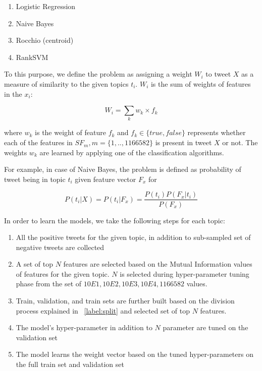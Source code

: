\begin{enumerate}
\item Logistic Regression
\item Naive Bayes
\item Rocchio (centroid)
\item RankSVM
\end{enumerate}

To this purpose, we define the problem as assigning a weight ${W_{i}}$ to tweet ${X}$ as a measure of similarity to the given topics ${t_{i}}$. ${W_{i}}$ is the sum of weights of  features in the ${x_{i}}$:

\begin{equation}
W_{i} = \sum_{k} w_{k}\times f_{k}
\end{equation}

where ${w_{k}}$ is the weight of feature ${f_{k}}$ and ${f_{k} \in \{true, false\}}$ represents whether each of the features in ${SF_{m}},m = \{ 1,..,1166582 \} $ is present in tweet ${X}$ or not. The weights ${w_{k}}$ are learned by applying one of the classification algorithms.

For example, in case of Naive Bayes, the problem is defined as probability of tweet being in topic ${t_{i}}$ given feature vector ${F_{x}}$ for 

\begin{equation}
P({t_{i}}|X) = P({t_{i}}|{F_{x}}) = \frac {P({t_{i}})P({F_{x}}|{t_{i}})}{P({F_{x}})}
\end{equation}


In order to learn the models, we take the following steps for each topic:
\begin{enumerate}
\item All the positive tweets for the given topic, in addition to sub-sampled set of negative tweets are collected
\item A set of top $N$ features are selected based on the Mutual Information values of features for the given topic. $N$ is selected during hyper-parameter tuning phase from the set of ${10E1, 10E2, 10E3, 10E4, 1166582}$ values.
\item Train, validation, and train sets are further built based on the division process explained in ~\ref{label:split} and selected set of top $N$ features.
\item The model's hyper-parameter in addition to $N$ parameter are tuned on the validation set
\item The model learns the weight vector based on the tuned hyper-parameters on the full train set and validation set
\end{enumerate}

